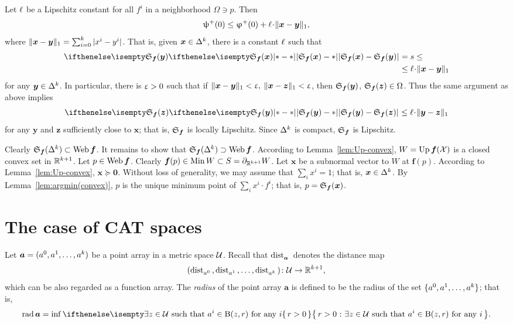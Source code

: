 Let ${\ell}$ be a Lipschitz constant for all $f^i$ in a neighborhood $\Omega\ni p$.
Then 
\[\psi^+(0)
\le 
\phi^+(0)+\Lip\cdot\|\bm{x}-\bm{y}\|_1,\] 
where $\|\bm{x}-\bm{y}\|_1=\sum_{i=0}^k|x^i-y^i|$.
That is, given $\bm{x}\in\Delta^\kay$, there is a constant ${\ell}$ such that
\begin{align*}
\dist{\spx{\bm{f}}(\bm{x})}{\spx{\bm{f}}(\bm{y})}{}
&=
s
\le
\\
&\le 
\Lip\cdot\|\bm{x}-\bm{y}\|_1
\end{align*}
for any $\bm{y}\in\Delta^\kay$.
In particular, there is $\upvarepsilon>0$ such that if $\|\bm{x}-\bm{y}\|_1<\upvarepsilon,$ $\|\bm{x}-\bm{z}\|_1 <\upvarepsilon$, then $\mathfrak{S}_{\bm{f}}(\bm{y})$, $\spx{\bm{f}}(\bm{z})\in\Omega$. 
Thus the same argument as above implies 
\[\dist{\spx{\bm{f}}(\bm{y})}{\spx{\bm{f}}(\bm{z})}{}
\le \Lip\cdot\|\bm{y}-\bm{z}\|_1\]
for any $\bm{y}$ and $\bm{z}$ sufficiently close to $\bm{x}$; that is, $\mathfrak{S}_{\bm{f}}$ is locally Lipschitz.
Since $\Delta^k$ is compact, $\mathfrak{S}_{\bm{f}}$ is Lipschitz.

Clearly $\spx{\bm{f}}(\Delta^\kay)\subset \Web \bm{f}$.
It remains to show that $\spx{\bm{f}}(\Delta^\kay)\supset \Web \bm{f}$.
According to Lemma~\ref{lem:Up-convex},
$W=\mathop{\rm Up}\nolimits\bm{f}(\mathcal{X})$ is a closed convex set in $\mathbb{R}^{k+1}$.
Let $p\in \Web \bm{f}$. 
Clearly $\bm{f}(p)\in \Min W\subset S\z=\Fr_{\RR^{\kay+1}}W$.
Let $\bm{x}$ be a subnormal vector to $W$ at $\bm{f}(p)$.
According to Lemma~\ref{lem:Up-convex}, 
$\bm{x} \succcurlyeq\bm{0}$.
Without loss of generality, we may assume that $\sum_i x^i=1$;
that is, $\bm{x}\in \Delta^\kay$.
By Lemma~\ref{lem:argmin(convex)},
$p$ is the unique minimum point of $\sum_i x^i\cdot f^i$;
that is, $p=\mathfrak{S}_{\bm{f}}(\bm{x})$.
\qeds








\section{The case of CAT spaces}

Let $\bm{a}=(a^0,a^1,\dots,a^\kay)$ be a point array in a metric space $\mathcal{U}$.
Recall that 
$\mathop{\rm dist}\nolimits_{\bm{a}}^{{}}{}{}$
denotes the distance map
\[(\distfun{a^0}{}{},\distfun{a^1}{}{},\dots,\distfun{a^\kay}{}{})\:\spc{U}\to\RR^{\kay+1},\]
which can be also regarded as a function array.
The \emph{radius} of the point array $\bm{a}$ is defined to be the radius of the set $\{a^0,a^1,\dots,a^\kay\}$;
that is,
\[\rad\bm{a}=\inf\set{r>0}{\exists z\in\spc{U}\ \text{such that}\ a^i\in \oBall(z,r)\ \text{for any}\ i}.\]

